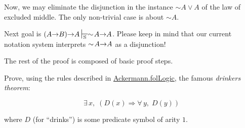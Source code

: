 
Now, we may eliminate the disjunction 
in the instance $\sim A \vee A$ of the law of excluded middle.
The only non-trivial case is about $\sim A$.

\vspace{4pt}

Next goal is $(A \arrow B) \arrow A \sdash \sim\!A \arrow A$.
Please keep in mind  that our current notation system interprets
$\sim\!A \mbox{$\rightarrow$} A$ as a disjunction!



The rest of the proof is composed of basic proof steps.



\begin{exercise}
Prove, using the rules described in 
 \href{../theories/html/hydras.Ackermann.folLogic.html}{Ackermann.folLogic}, the famous \emph{drinkers theorem}:

$$\exists\,x,\; (D(x)\Longrightarrow \forall\,y,\; D(y))$$
\end{exercise}

where $D$ (for ``drinks'') is some predicate symbol of arity $1$.


